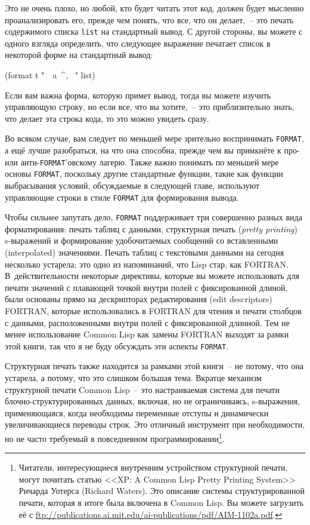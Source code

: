 Это не очень плохо, но любой, кто будет читать этот код, должен будет мысленно
проанализировать его, прежде чем понять, что все, что он делает,~-- это печать содержимого
списка \lstinline{list} на стандартный вывод. С другой стороны, вы можете с одного взгляда
определить, что следующее выражение печатает список в некоторой форме на стандартный
вывод:

\begin{myverb}
(format t "~{~a~^, ~}" list)
\end{myverb}

Если вам важна форма, которую примет вывод, тогда вы можете изучить управ\-ляю\-щую строку, но
если все, что вы хотите,~-- это приблизительно знать, что делает эта строка кода, то это
можно увидеть сразу.

Во всяком случае, вам следует по меньшей мере зрительно воспринимать \lstinline{FORMAT}, а ещё
лучше разобраться, на что она способна, прежде чем вы примкнёте к про- или
анти-\lstinline{FORMAT}'овскому лагерю. Также важно понимать по меньшей мере основы
\lstinline{FORMAT}, поскольку другие стандартные функции, такие как функции выбрасывания
условий, обсуждаемые в следующей главе, используют управляющие строки в стиле
\lstinline{FORMAT} для формирования вывода.

Чтобы сильнее запутать дело, \lstinline{FORMAT} поддерживает три совершенно разных вида
форматирования: печать таблиц с данными, структурная печать (\textit{pretty printing})
s-выражений и формирование удобочитаемых сообщений со вставленными (interpolated)
значениями. Печать таблиц с текстовыми данными на сегодня несколько устарела; это одно из
напоминаний, что Lisp стар, как FORTRAN. В~действительности некоторые директивы, которые
вы можете использовать для печати значений с плавающей точкой внутри полей с фиксированной
длиной, были основаны прямо на дескрипторах редактирования (edit descriptors) FORTRAN,
которые использовались в FORTRAN для чтения и печати столбцов с данными, расположенными
внутри полей с фиксированной длинной. Тем не менее использование Common Lisp как замены
FORTRAN выходят за рамки этой книги, так что я не буду обсуждать эти аспекты
\lstinline{FORMAT}.

Структурная печать также находится за рамками этой книги~-- не потому, что она устарела, а
потому, что это слишком большая тема. Вкратце механизм структурной печати Common Lisp~--
это настраиваемая система для печати блочно-структурированных данных, включая, но не
ограничиваясь, s-выражения, применяющаяся, когда необходимы переменные отступы и
динамически увеличивающиеся переводы строк. Это отличный инструмент при необходимости, но
не часто требуемый в повседневном программировании\footnote{Читатели, интересующиеся
  внутренним устройством структурной печати, могут почитать статью <<XP: A Common Lisp
  Pretty Printing System>> Ричарда Уотерса (Richard Waters). Это описание системы
  структурированной печати, которая в итоге была включена в Common Lisp. Вы можете 
  загрузить её с \url{ftp://publications.ai.mit.edu/ai-publications/pdf/AIM-1102a.pdf}.}.

